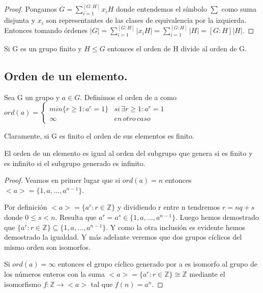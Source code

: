 \begin{proof}
Pongamos $G = \sum_{i=1}^{[G:H]} x_iH$ donde entendemos el símbolo $\sum$ como suma disjunta y $x_i$ son representantes de las clases de equivalencia por la izquierda. Entonces tomando órdenes $|G| = \sum_{i=1}^{[G:H]} |x_iH| =  \sum_{i=1}^{[G:H]} |H| = [G:H]|H|$.
\end{proof}

\begin{corollary}
Si G es un grupo finito y $H \le G$ entonces el orden de H divide al orden de G. 
\end{corollary}

\subsection{Orden de un elemento.}

\begin{definition}
Sea G un grupo y $a \in G$. Definimos el orden de a como 
$ord(a) = 
\begin{cases}
min\{r \ge 1:a^r = 1	\} & si \, \exists r \ge 1 : a^r = 1 \\
\infty & en \, otro \, caso
\end{cases}$

Claramente, si G es finito el orden de sus elementos es finito.
\end{definition}

\begin{proposition}
El orden de un elemento es igual al orden del subgrupo que genera si es finito y es infinito si el subgrupo generado es infinito.
\end{proposition}

\begin{proof}
Veamos en primer lugar que si $ord(a) = n$ entonces $<a> = \{1,a,...,a^{n-1}\}$.

Por definición $<a> = \{a^r:r \in \mathbb{Z}\}$ y dividiendo r entre n tendremos $r = nq + s$ donde $0 \le s < n$. Resulta que $a^r = a^s \in \{1,a,...,a^{n-1}\}$. Luego hemos demostrado que $\{a^r:r \in \mathbb{Z}\} \subseteq \{1,a,...,a^{n-1}\}$. Y como la otra inclusión es evidente hemos demostrado la igualdad. Y más adelante veremos que dos grupos cíclicos del mismo orden son isomorfos.

Si $ord(a) = \infty$ entonces el grupo cíclico generado por a es isomorfo al grupo de los números enteros con la suma $<a> = \{a^r:r \in \mathbb{Z}\} \cong \mathbb{Z}$ mediante el isomorfismo $f:\mathbb{Z} \rightarrow <a>$ tal que $f(n) = a^n$.
\end{proof}

